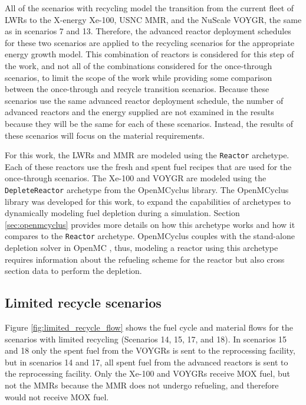 All of the scenarios with recycling model the transition from the 
current fleet of \glspl{LWR} to the X-energy Xe-100, \gls{USNC} \gls{MMR}, 
and the NuScale VOYGR, the same as in scenarios 7 and 13. Therefore, 
the advanced reactor deployment schedules for these two scenarios are applied 
to the recycling scenarios for the appropriate energy growth model. 
This combination 
of reactors is considered for this step of the work, and not all of the 
combinations considered for the once-through scenarios, to limit the scope 
of the work while providing some comparison between the 
once-through and recycle transition scenarios. Because these scenarios 
use the same advanced reactor deployment schedule, the number of 
advanced reactors and the energy supplied are not examined in the 
results because they will be the same for each of these scenarios. Instead, 
the results of these scenarios will focus on the material requirements. 

For this work, the \glspl{LWR} and \gls{MMR} are modeled using the 
\Cycamore \texttt{Reactor} archetype. Each of these reactors use the 
fresh and spent fuel recipes that are used for the once-through scenarios. 
The Xe-100 and VOYGR are modeled using the \texttt{DepleteReactor} 
archetype from the OpenMCyclus library. The OpenMCyclus library was 
developed for this work, to expand the capabilities of \Cyclus archetypes 
to dynamically modeling fuel depletion during a simulation. Section 
\ref{sec:openmcyclus} provides more details on how this archetype 
works and how it compares to the \Cycamore \texttt{Reactor} 
archetype. OpenMCyclus couples with the stand-alone depletion 
solver in OpenMC \cite{romano_depletion_2021}, thus, modeling a 
reactor using this archetype requires information about the refueling 
scheme for the reactor but also cross section data to perform the 
depletion. 

\subsection{Limited recycle scenarios}
Figure \ref{fig:limited_recycle_flow} shows the fuel cycle and material flows 
for the scenarios with limited recycling (Scenarios 14, 15, 17, and 18). 
In scenarios 15 and 18 only the spent fuel from the 
VOYGRs is sent to the reprocessing facility, but in scenarios 14 and 17, 
all spent fuel from the advanced reactors is sent to the 
reprocessing facility. Only the Xe-100 and VOYGRs receive \gls{MOX} fuel, 
but not the \glspl{MMR} because the \gls{MMR} does not undergo refueling, 
and therefore would not receive \gls{MOX} fuel. 

